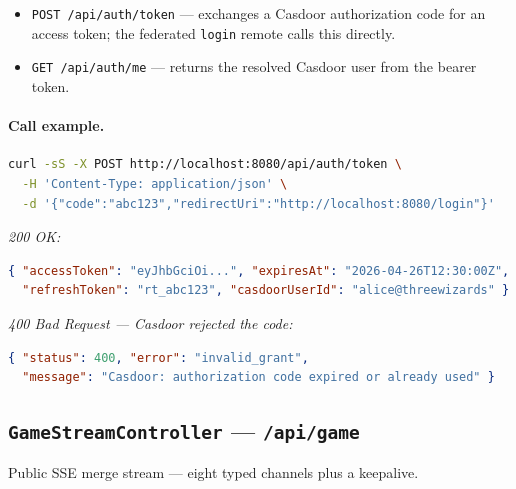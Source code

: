 \begin{itemize}
  \item \texttt{POST /api/auth/token} — exchanges a Casdoor authorization
        code for an access token; the federated \texttt{login} remote
        calls this directly.
  \item \texttt{GET /api/auth/me} — returns the resolved Casdoor user
        from the bearer token.
\end{itemize}


\paragraph{Call example.}
\begin{lstlisting}[language=bash]
curl -sS -X POST http://localhost:8080/api/auth/token \
  -H 'Content-Type: application/json' \
  -d '{"code":"abc123","redirectUri":"http://localhost:8080/login"}'
\end{lstlisting}
\textit{200 OK:}
\begin{lstlisting}[language=json]
{ "accessToken": "eyJhbGciOi...", "expiresAt": "2026-04-26T12:30:00Z",
  "refreshToken": "rt_abc123", "casdoorUserId": "alice@threewizards" }
\end{lstlisting}
\textit{400 Bad Request — Casdoor rejected the code:}
\begin{lstlisting}[language=json]
{ "status": 400, "error": "invalid_grant",
  "message": "Casdoor: authorization code expired or already used" }
\end{lstlisting}

\subsection{\texttt{GameStreamController} — \texttt{/api/game}}
Public SSE merge stream — eight typed channels plus a keepalive.


